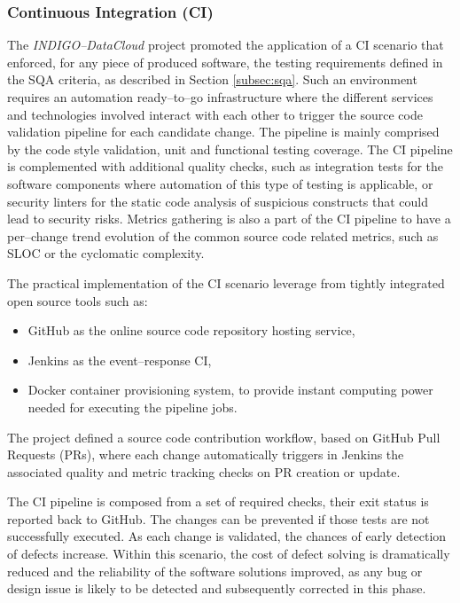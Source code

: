 \subsubsection{Continuous Integration (CI)}
\label{subsec:ci}

The {\sl INDIGO--DataCloud} project promoted the application of a CI scenario that enforced,
for any piece of produced software, the testing requirements defined in the SQA criteria,
as described in Section \ref{subsec:sqa}. Such an environment requires an automation
ready--to--go infrastructure where the different services and technologies involved interact with each
other to trigger the source code validation pipeline for each candidate change. The
pipeline is mainly comprised by the code style validation, unit and functional testing
coverage. The CI pipeline is complemented with additional quality checks, such as
integration tests for the software components where automation of this type of testing
is applicable, or security linters for the static code analysis of suspicious
constructs that could lead to security risks. Metrics gathering is also a part of
the CI pipeline to have a per--change trend evolution of the common source code
related metrics, such as SLOC or the cyclomatic complexity.

The practical implementation of the CI scenario leverage from tightly integrated open
source tools such as:
\begin{itemize}
    \item GitHub \cite{foot9} as the online source code repository hosting service,
    \item Jenkins as the event--response CI,
    \item Docker container provisioning system, to provide instant computing power needed
          for executing the pipeline jobs.
\end{itemize}
The project defined a source code contribution workflow, based on GitHub Pull Requests
(PRs), where each change automatically triggers in Jenkins the associated quality and
metric tracking checks on PR creation or update.

The CI pipeline is composed from a set of required checks, their exit status
is reported back to GitHub. The changes can be prevented if those tests are
not successfully executed.
As each change is validated, the chances
of early detection of defects increase. Within this scenario, the cost of defect solving
is dramatically reduced and the reliability of the software solutions improved, as any
bug or design issue is likely to be detected and subsequently corrected in this phase.

